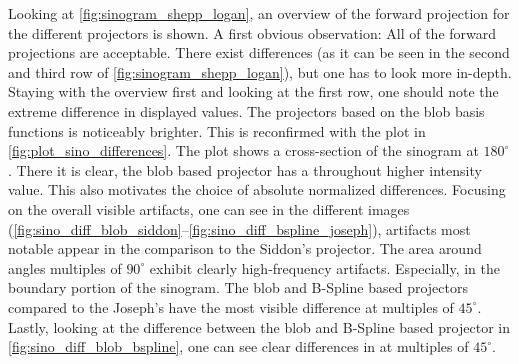 Looking at \autoref{fig:sinogram_shepp_logan}, an overview of the forward projection for the
different projectors is shown. A first obvious observation: All of the forward projections are
acceptable. There exist differences (as it can be seen in the second and third row of
\autoref{fig:sinogram_shepp_logan}), but one has to look more in-depth. Staying with the overview
first and looking at the first row, one should note the extreme difference in displayed values. The
projectors based on the blob basis functions is noticeably brighter. This is reconfirmed with the
plot in \autoref{fig:plot_sino_differences}. The plot shows a cross-section of the sinogram at
\(180^\circ\). There it is clear, the blob based projector has a throughout higher intensity value.
This also motivates the choice of absolute normalized differences. Focusing on the overall visible
artifacts, one can see in the different images
(\autoref{fig:sino_diff_blob_siddon}--\autoref{fig:sino_diff_bspline_joseph}), artifacts most
notable appear in the comparison to the Siddon's projector. The area around angles multiples of
\(90^\circ\) exhibit clearly high-frequency artifacts. Especially, in the boundary portion of the
sinogram. The blob and B-Spline based projectors compared to the Joseph's have the most visible
difference at multiples of \(45^\circ\). Lastly, looking at the difference between the blob and
B-Spline based projector in \autoref{fig:sino_diff_blob_bspline}, one can see clear differences in
at multiples of \(45^\circ\).


